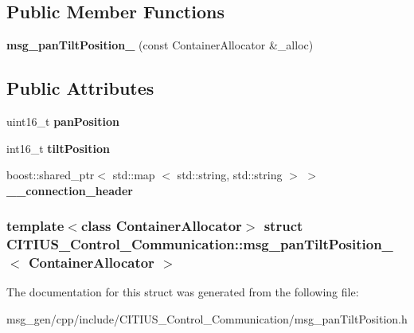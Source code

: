 \subsection*{\-Public \-Member \-Functions}
\begin{DoxyCompactItemize}
\item 
\hypertarget{struct_c_i_t_i_u_s___control___communication_1_1msg__pan_tilt_position___ab7f90c5af38d842af1276926809e12c4}{{\bfseries msg\-\_\-pan\-Tilt\-Position\-\_\-} (const \-Container\-Allocator \&\-\_\-alloc)}\label{struct_c_i_t_i_u_s___control___communication_1_1msg__pan_tilt_position___ab7f90c5af38d842af1276926809e12c4}

\end{DoxyCompactItemize}
\subsection*{\-Public \-Attributes}
\begin{DoxyCompactItemize}
\item 
\hypertarget{struct_c_i_t_i_u_s___control___communication_1_1msg__pan_tilt_position___a24044cd04e83cd922b93f238460770c9}{uint16\-\_\-t {\bfseries pan\-Position}}\label{struct_c_i_t_i_u_s___control___communication_1_1msg__pan_tilt_position___a24044cd04e83cd922b93f238460770c9}

\item 
\hypertarget{struct_c_i_t_i_u_s___control___communication_1_1msg__pan_tilt_position___aa47086c0ad0b6eb2bd8a1685a7c6eb48}{int16\-\_\-t {\bfseries tilt\-Position}}\label{struct_c_i_t_i_u_s___control___communication_1_1msg__pan_tilt_position___aa47086c0ad0b6eb2bd8a1685a7c6eb48}

\item 
\hypertarget{struct_c_i_t_i_u_s___control___communication_1_1msg__pan_tilt_position___acf7b07a896572a09763c50e07408b2f5}{boost\-::shared\-\_\-ptr$<$ std\-::map\*
$<$ std\-::string, std\-::string $>$ $>$ {\bfseries \-\_\-\-\_\-connection\-\_\-header}}\label{struct_c_i_t_i_u_s___control___communication_1_1msg__pan_tilt_position___acf7b07a896572a09763c50e07408b2f5}

\end{DoxyCompactItemize}
\subsubsection*{template$<$class Container\-Allocator$>$ struct C\-I\-T\-I\-U\-S\-\_\-\-Control\-\_\-\-Communication\-::msg\-\_\-pan\-Tilt\-Position\-\_\-$<$ Container\-Allocator $>$}



\-The documentation for this struct was generated from the following file\-:\begin{DoxyCompactItemize}
\item 
msg\-\_\-gen/cpp/include/\-C\-I\-T\-I\-U\-S\-\_\-\-Control\-\_\-\-Communication/msg\-\_\-pan\-Tilt\-Position.\-h\end{DoxyCompactItemize}
